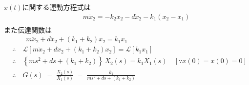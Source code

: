 \documentclass[a4paper,12pt]{article}
\begin{document}
\begin{tcolorbox}[title={4. (1)この図によって示されるシステムの運動方程式と伝達関数を求めよ。 
    }]

    \(x(t)\)に関する運動方程式は
    \begin{align*}
        &\qquad m\ddot{x}_2 =-k_2 x_2 - d \dot{x}_2 - k_1 \left(x_2 - x_1\right) \\
    \end{align*}
    また伝達関数は
    \begin{align*}
        &\qquad m\ddot{x}_2 +  d \dot{x}_2 + \left(k_1+k_2\right) x_2
        = k_1 x_1 \\
        &\therefore \quad \mathcal{L} \left[ m\ddot{x}_2 +  d \dot{x}_2 + \left(k_1+k_2\right) x_2\right] 
        =\mathcal{L} \left[ k_1 x_1 \right] \\
        &\therefore \quad \left\{m s^2 + d s + \left(k_1+k_2\right) \right\}\,X_2(s) = k_1 X_1(s) \quad [\because \dot{x}(0)=x(0)=0 ]\\
        &\therefore \quad G(s) \;=\;\frac{X_2(s)}{X_1(s)}
        \;=\;\frac{k_1}{m s^2 + d s + \left(k_1 + k_2\right)}
    \end{align*}

\end{tcolorbox}
\end{document}
